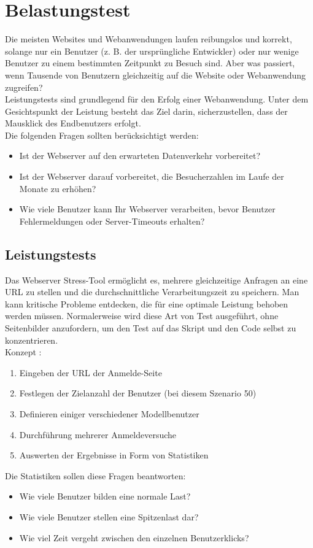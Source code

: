 \section{Belastungstest}
Die meisten Websites und Webanwendungen laufen reibungslos und korrekt, solange nur ein Benutzer (z. B. der ursprüngliche Entwickler) oder nur wenige Benutzer zu einem bestimmten Zeitpunkt zu Besuch sind. Aber was passiert, wenn Tausende von Benutzern gleichzeitig auf die Website oder Webanwendung zugreifen?\\
Leistungstests sind grundlegend für den Erfolg einer Webanwendung. Unter dem Gesichtspunkt der Leistung besteht das Ziel darin, sicherzustellen, dass der Mausklick des Endbenutzers erfolgt.\\
Die folgenden Fragen sollten berücksichtigt werden:
\begin{itemize}
\item Ist der Webserver auf den erwarteten Datenverkehr vorbereitet?
\item Ist der Webserver darauf vorbereitet, die Besucherzahlen im Laufe der Monate zu erhöhen?
\item Wie viele Benutzer kann Ihr Webserver verarbeiten, bevor Benutzer Fehlermeldungen oder Server-Timeouts erhalten?
\end{itemize}
\subsection*{Leistungstests}
Das Webserver Stress-Tool ermöglicht es, mehrere gleichzeitige Anfragen an eine URL zu stellen und die durchschnittliche Verarbeitungszeit zu speichern. Man kann kritische Probleme entdecken, die für eine optimale Leistung behoben werden müssen. Normalerweise wird diese Art von Test ausgeführt, ohne Seitenbilder anzufordern, um den Test auf das Skript und den Code selbst zu konzentrieren.\\
Konzept :
\begin{enumerate}
\item Eingeben der URL der Anmelde-Seite
\item Festlegen der Zielanzahl der Benutzer (bei diesem Szenario 50)
\item Definieren einiger verschiedener \glqq Modellbenutzer\grqq{}
\item Durchführung mehrerer Anmeldeversuche
\item Auswerten der Ergebnisse in Form von Statistiken
\end{enumerate}
Die Statistiken sollen diese Fragen beantworten:
\begin{itemize}
\item Wie viele Benutzer bilden eine normale Last? 
\item Wie viele Benutzer stellen eine Spitzenlast dar?
\item Wie viel Zeit vergeht zwischen den einzelnen Benutzerklicks?
\end{itemize}
